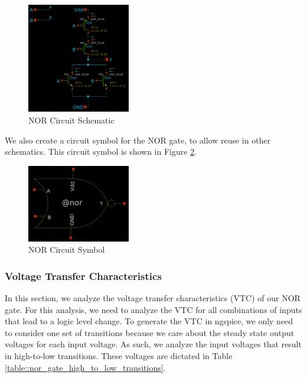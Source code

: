 \documentclass[fleqn]{article}
\begin{document}
	\begin{figure}[H]
		\centerline{\includegraphics[width=0.4\textwidth]{nor_schematic.png}}
		\caption{NOR Circuit Schematic}
		\label{fig::nor_schematic}
	\end{figure}
	
	\noindent We also create a circuit symbol for the NOR gate, to allow reuse in other schematics. This circuit symbol is shown in Figure \ref{fig::nor_symbol}.
	
	\begin{figure}[H]
		\centerline{\includegraphics[width=0.4\textwidth]{nor_symbol.png}}
		\caption{NOR Circuit Symbol}
		\label{fig::nor_symbol}
	\end{figure}

	\subsubsection{Voltage Transfer Characteristics}
	
	In this section, we analyze the voltage transfer characteristics (VTC) of our NOR gate. For this analysis, we need to analyze the VTC for all combinations of inputs that lead to a logic level change. To generate the VTC in ngspice, we only need to consider one set of transitions because we care about the steady state output voltages for each input voltage. As such, we analyze the input voltages that result in high-to-low transitions. These voltages are dictated in Table \ref{table::nor_gate_high_to_low_transitions}.
	
\end{document}
